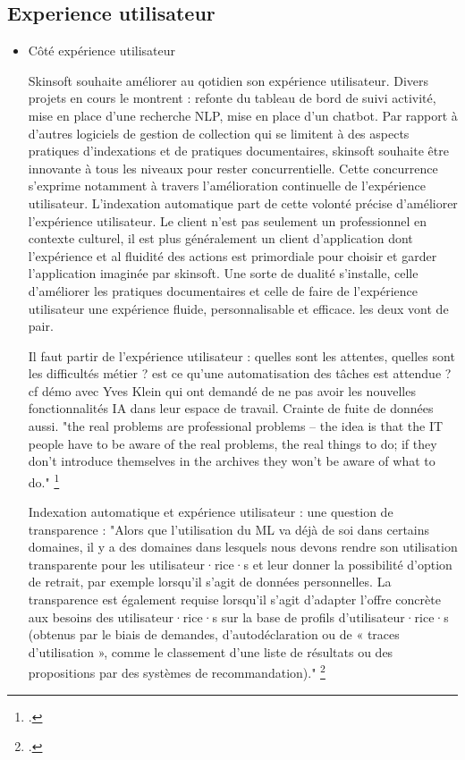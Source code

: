 \subsection{Experience utilisateur}

\begin{itemize}
	\item Côté expérience utilisateur 
	
	Skinsoft souhaite améliorer au qotidien son expérience utilisateur. Divers projets en cours le montrent : refonte du tableau de bord de suivi activité, mise en place d'une recherche NLP, mise en place d'un chatbot. Par rapport à d'autres logiciels de gestion de collection qui se limitent à des aspects pratiques d'indexations et de pratiques documentaires, skinsoft souhaite être innovante à tous les niveaux pour rester concurrentielle. Cette concurrence s'exprime notamment à travers l'amélioration continuelle de l'expérience utilisateur. L'indexation automatique part de cette volonté précise d'améliorer l'expérience utilisateur. Le client n'est pas seulement un professionnel en contexte culturel, il est plus généralement un client d'application dont l'expérience et al fluidité des actions est primordiale pour choisir et garder l'application imaginée par skinsoft. Une sorte de dualité s'installe, celle d'améliorer les pratiques documentaires et celle de faire de l'expérience utilisateur une expérience fluide, personnalisable et efficace. les deux vont de pair. 
	
	Il faut partir de l'expérience utilisateur : quelles sont les attentes, quelles sont les difficultés métier ? est ce qu'une automatisation des tâches est attendue ? cf démo avec Yves Klein qui ont demandé de ne pas avoir les nouvelles fonctionnalités IA dans leur espace de travail. Crainte de fuite de données aussi. 
	"the real problems are professional problems – the idea is that the IT people have to be aware of the real problems, the real things to do; if they don’t introduce themselves in the archives they won’t be aware of what to do."
	\footcite{2021b}
	
	Indexation automatique et expérience utilisateur : une question de transparence : 
	"Alors que l'utilisation du ML	va déjà de soi dans certains domaines, il y a des domaines dans lesquels nous devons	rendre son utilisation transparente pour les utilisateur·rice·s et leur donner la possibilité
	d'option de retrait, par exemple lorsqu'il s'agit de données personnelles. La transparence est également requise lorsqu'il s'agit d'adapter l'offre concrète aux besoins des utilisateur·rice·s	sur la base de profils d'utilisateur·rice·s (obtenus par le biais de demandes, d'autodéclaration ou de « traces d'utilisation », comme le classement d'une liste de résultats ou	des propositions par des systèmes de recommandation)."
	\footcite{zotero-item-584}
	

\end{itemize}
